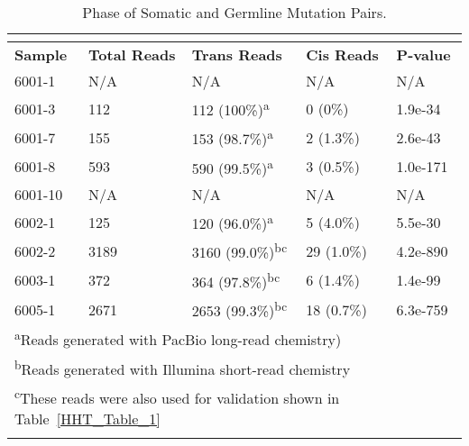 \begin{table}[]
\footnotesize
\renewcommand{\arraystretch}{1.4} 
\centering
\caption[Phase of Somatic and Germline Mutations in Telangeicasia]{Phase of Somatic and Germline Mutation Pairs.}

\begin{tabularx}{0.75\linewidth}{lllll}
\multicolumn{5}{l}{} \\
\toprule
\textbf{Sample} & \textbf{Total Reads} & \textbf{Trans Reads} & \textbf{Cis Reads} & \textbf{P-value} \\
\midrule
6001-1	& N/A	& N/A						& N/A		& N/A \\\hline
6001-3	& 112	& 112 (100\%)\textsuperscript{a}	& 0 (0\%)		& 1.9e-34 \\\hline
6001-7	& 155	& 153 (98.7\%)\textsuperscript{a}	& 2 (1.3\%)	& 2.6e-43 \\\hline
6001-8	& 593	& 590 (99.5\%)\textsuperscript{a}	& 3 (0.5\%)	& 1.0e-171 \\\hline
6001-10	& N/A	& N/A						& N/A		& N/A \\\hline
6002-1	& 125	& 120 (96.0\%)\textsuperscript{a}	& 5 (4.0\%)	& 5.5e-30 \\\hline
6002-2	& 3189	& 3160 (99.0\%)\textsuperscript{bc}	& 29 (1.0\%)	& 4.2e-890 \\\hline
6003-1	& 372	& 364 (97.8\%)\textsuperscript{bc}	& 6 (1.4\%)	& 1.4e-99 \\\hline
6005-1	& 2671	& 2653 (99.3\%)\textsuperscript{bc}	& 18 (0.7\%)	& 6.3e-759 \\

\bottomrule
\multicolumn{5}{l}{\textsuperscript{a}Reads generated with PacBio long-read chemistry)} \\
\multicolumn{5}{l}{\textsuperscript{b}Reads generated with Illumina short-read chemistry} \\
\multicolumn{5}{l}{\textsuperscript{c}These reads were also used for validation shown in Table~\ref{HHT_Table_1}} \\
\label{HHT_Table_2}
\end{tabularx}

\end{table}



